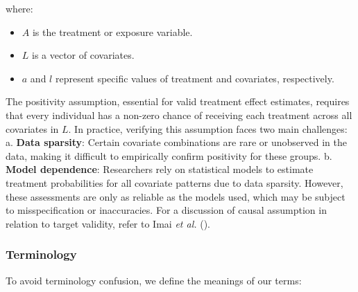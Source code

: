 \documentclass[
  single column]{article}
\providecommand{\tightlist}{%
  \setlength{\itemsep}{0pt}\setlength{\parskip}{0pt}}\usepackage{longtable,booktabs,array}
\begin{document}
where:

\begin{itemize}
\tightlist
\item
  \(A\) is the treatment or exposure variable.
\item
  \(L\) is a vector of covariates.
\item
  \(a\) and \(l\) represent specific values of treatment and covariates,
  respectively.
\end{itemize}

The positivity assumption, essential for valid treatment effect
estimates, requires that every individual has a non-zero chance of
receiving each treatment across all covariates in \(L\). In practice,
verifying this assumption faces two main challenges: a. \textbf{Data
sparsity}: Certain covariate combinations are rare or unobserved in the
data, making it difficult to empirically confirm positivity for these
groups. b. \textbf{Model dependence}: Researchers rely on statistical
models to estimate treatment probabilities for all covariate patterns
due to data sparsity. However, these assessments are only as reliable as
the models used, which may be subject to misspecification or
inaccuracies. For a discussion of causal assumption in relation to
target validity, refer to Imai \emph{et al.}
().

\subsubsection{Terminology}\label{terminology}

To avoid terminology confusion, we define the meanings of our terms:
\end{document}

